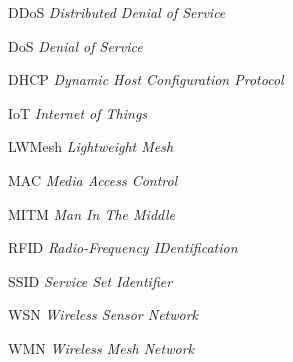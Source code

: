 \begin{siglas}
    \item[DDoS] \emph{Distributed Denial of Service}
    \item[DoS] \emph{Denial of Service}
    \item[DHCP] \emph{Dynamic Host Configuration Protocol}
    \item[IoT] \emph{Internet of Things}
    \item[LWMesh] \emph{Lightweight Mesh}
    \item[MAC] \emph{Media Access Control}
    \item[MITM] \emph{Man In The Middle}
    \item[RFID] \emph{Radio-Frequency IDentification}
    \item[SSID] \emph{Service Set Identifier}
    \item[WSN] \emph{Wireless Sensor Network}
    \item[WMN] \emph{Wireless Mesh Network}
\end{siglas}